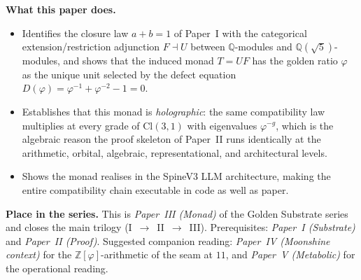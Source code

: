 \documentclass[11pt,a4paper]{article}
\theoremstyle{plain}
\theoremstyle{definition}
\theoremstyle{remark}
\numberwithin{equation}{section}
\providecommand{\Cl}{\mathrm{Cl}}
\providecommand{\Z}{\mathbb{Z}}
\providecommand{\Q}{\mathbb{Q}}
\providecommand{\vp}{\varphi}
\begin{document}
\begin{abstract}
\medskip\noindent\textbf{The curvature--bivector bridge.}
The discrete acoustic substrate admits a continuous limit, in
which curvature is identified with bivector commutator content.
This produces General Relativity as the smooth limit of the
discrete framework, with three quantitative predictions: the
Barbero--Immirzi parameter $\gamma_{\mathrm{NGR}} \approx 0.255$,
the cosmological constant $\Lambda \approx 10^{-122} \rho_P$, and
dark matter as the conformal-bridge mode.  See \cref{sec:gr-bridge}.

\medskip\noindent\textbf{The witness as a free parameter.}
The witness operator $W\colon \tau_t \mapsto \chi_{t+1}$---the
agent that converts returned trace into the next chiral
selection---is identified as the formal object whose nature the
mathematics does not determine.  The Holographic Witness Theorem
is silent on \emph{what} chooses; it only says that the choice
does not affect global coherence.  Speculation about the nature
of $W$ is deferred to a philosophical companion.
\end{abstract}

\medskip
\noindent\textbf{What this paper does.}
\begin{itemize}[leftmargin=1.5em,nosep,topsep=2pt]
  \item Identifies the closure law $a + b = 1$ of Paper~I with the
        categorical extension/restriction adjunction
        $F \dashv U$ between $\Q$-modules and
        $\Q(\sqrt 5)$-modules, and shows that the induced monad
        $T = U F$ has the golden ratio $\vp$ as the unique
        unit selected by the defect equation
        $D(\vp) = \vp^{-1} + \vp^{-2} - 1 = 0$.
  \item Establishes that this monad is \emph{holographic}: the
        same compatibility law multiplies at every grade of
        $\Cl(3,1)$ with eigenvalues $\vp^{-g}$, which is the
        algebraic reason the proof skeleton of Paper~II runs
        identically at the arithmetic, orbital, algebraic,
        representational, and architectural levels.
  \item Shows the monad realises in the SpineV3 LLM architecture,
        making the entire compatibility chain executable in code as
        well as paper.
\end{itemize}

\medskip
\noindent\textbf{Place in the series.}
This is \emph{Paper~III (Monad)} of the Golden Substrate series and
closes the main trilogy (I~$\to$~II~$\to$~III).  Prerequisites:
\emph{Paper~I (Substrate)} and \emph{Paper~II (Proof)}.  Suggested
companion reading: \emph{Paper~IV (Moonshine context)} for the
$\Z[\vp]$-arithmetic of the seam at $11$, and
\emph{Paper~V (Metabolic)} for the operational reading.
\end{document}
